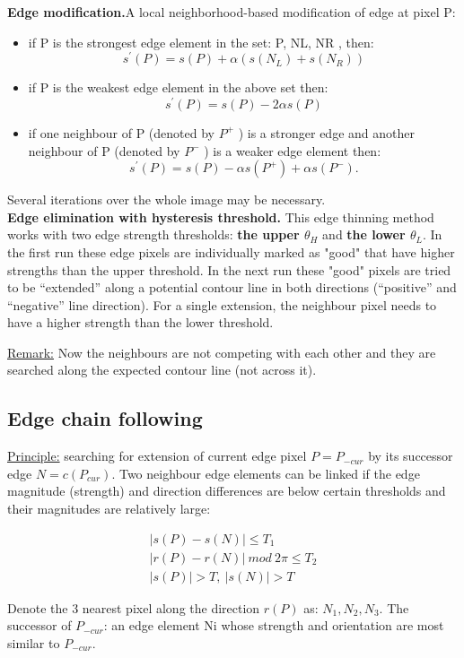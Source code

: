 \documentclass[letterpaper,12pt]{article}
\begin{document}
\textbf{Edge modification.}A local neighborhood-based modification of edge at pixel P:
\begin{itemize}
	\item if P is the strongest edge element in the set: P, NL, NR , then:
\[ s^{'} (P)=s(P)+ \alpha(s(N_L)+s(N_R ))\]
	\item if P is the weakest edge element in the above set then:
\[s^{'}(P) = s(P) - 2 \alpha s(P) \]
	\item if one neighbour of P (denoted by $P^+$ ) is a stronger edge and another neighbour of P (denoted by $P^-$ ) is a weaker edge element then:
\[s^{'}(P) = s(P) - \alpha s(P^+) + \alpha s(P^-).\]
\end{itemize}

Several iterations over the whole image may be necessary.\\

\textbf{Edge elimination with hysteresis threshold.} This edge thinning method works with two edge strength thresholds: \textbf{the upper $\theta_H$} and \textbf{the lower $\theta_L$}.
In the first run these edge pixels are individually marked as "good" that have higher strengths than the upper threshold.
In the next run these "good" pixels are tried to be “extended” along a potential contour line in both directions (“positive” and “negative” line direction). For a single extension, the neighbour pixel needs to have a higher strength than the lower threshold.

\underline{Remark:} Now the neighbours are not competing with each other and they are searched along the expected contour line (not across it).


\subsection{Edge chain following}

\underline{Principle:} searching for extension of current edge pixel $P=P_{-cur}$ by its successor edge $N=c(P_{cur})$.
Two neighbour edge elements can be linked if the edge magnitude (strength) and direction differences are below certain thresholds and their magnitudes are relatively large:

\begin{gather}
	|s(P)-s(N)|\leq T_1 \\
	|r(P)-r(N)|\ mod\ 2\pi\leq T_2 \\
	|s(P)|>T,\ |s(N)|>T
\end{gather}

Denote the 3 nearest pixel along the direction $r(P)$ as: $N_1, N_2, N_3$. The successor of $P_{-cur}$: an edge element Ni whose strength and
 orientation are most similar to $P_{-cur}$.
\end{document}
